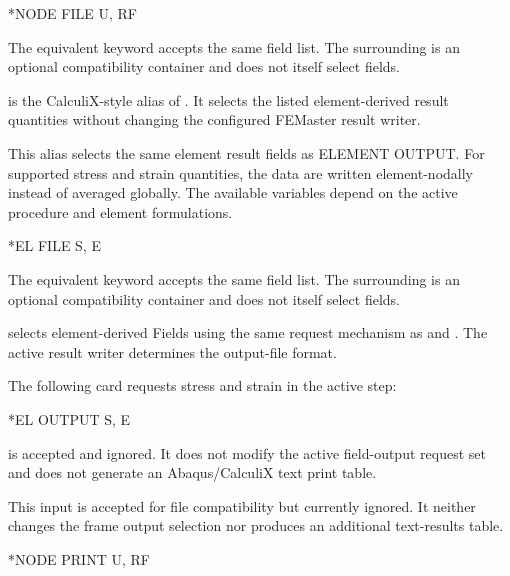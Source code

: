\exampleheading
\begin{inputdeck}
*NODE FILE
U, RF
\end{inputdeck}

The equivalent  keyword accepts the same
field list. The surrounding  is an optional
compatibility container and does not itself select fields.


 is the CalculiX-style alias of . It selects the listed element-derived result quantities without changing the configured FEMaster result writer.

This alias selects the same element result fields as ELEMENT OUTPUT. For supported stress and strain quantities, the data are written element-nodally instead of averaged globally. The available variables depend on the active procedure and element formulations.

\exampleheading
\begin{inputdeck}
*EL FILE
S, E
\end{inputdeck}

The equivalent  keyword accepts the same
field list. The surrounding  is an optional
compatibility container and does not itself select fields.


 selects element-derived Fields using the same request
mechanism as  and . The active
result writer determines the output-file format.

The following card requests stress and strain in the active step:
\exampleheading
\begin{inputdeck}
*EL OUTPUT
S, E
\end{inputdeck}


 is accepted and ignored. It does not modify the active field-output request set and does not generate an Abaqus/CalculiX text print table.

This input is accepted for file compatibility but currently ignored. It neither changes the frame output selection nor produces an additional text-results table.

\exampleheading
\begin{inputdeck}
*NODE PRINT
U, RF
\end{inputdeck}


